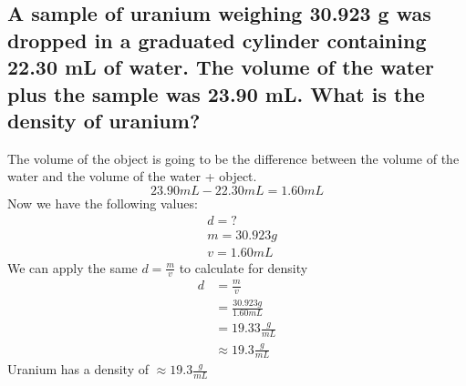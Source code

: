 \documentclass{scrartcl}
\begin{document}
\subsection{A sample of uranium weighing 30.923 g was dropped in a graduated cylinder containing 22.30 mL of water. The volume of the water plus the sample was 23.90 mL. What is the density of uranium?}
\label{sec:orgfec0ce8}
The volume of the object is going to be the difference between the volume of the water and the volume of the water + object.
\begin{equation}
23.90mL - 22.30mL = 1.60mL
\end{equation}
Now we have the following values:
\begin{align*}
&d = ?\\
&m = 30.923g\\
&v = 1.60mL
\end{align*}
We can apply the same \(d=\frac{m}{v}\) to calculate for density
\begin{align*}
d&=\frac{m}{v}\\
            &=\frac{30.923g}{1.60mL}\\
            &=19.33\frac{g}{mL}\\
            &\approx19.3\frac{g}{mL}
\end{align*}
Uranium has a density of \(\approx19.3\frac{g}{mL}\)
\end{document}
